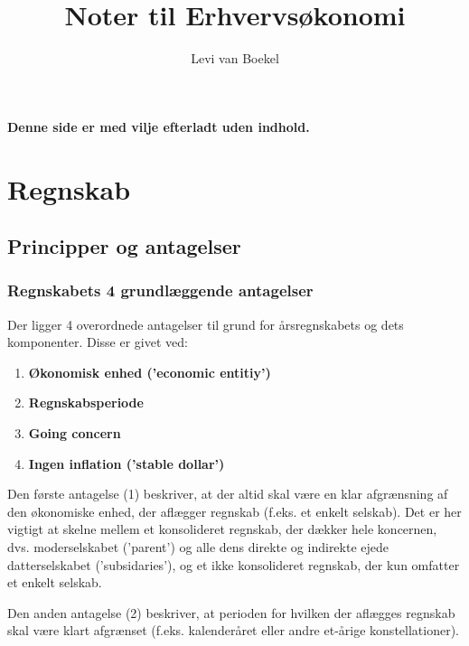 \documentclass[10pt,reqno, usenames]{article}
\title{Noter til Erhvervsøkonomi}
\author{Levi van Boekel}
\begin{document}
\maketitle


\tableofcontents

\newpage
\vspace*{\fill}
\begin{center}
    \textbf{Denne side er med vilje efterladt uden indhold.}
\end{center}
\vspace*{\fill}

\newpage
\section{Regnskab}

\subsection{Principper og antagelser}
\subsubsection{Regnskabets 4 grundlæggende antagelser}
Der ligger 4 overordnede antagelser til grund for årsregnskabets og dets komponenter. Disse er givet ved: 

\begin{enumerate}
    \item \textbf{Økonomisk enhed ('economic entitiy')}
    \item \textbf{Regnskabsperiode}
    \item \textbf{Going concern}
    \item \textbf{Ingen inflation ('stable dollar')}
\end{enumerate}

Den første antagelse (1) beskriver, at der altid skal være en klar afgrænsning af den økonomiske enhed, der aflægger regnskab (f.eks. et enkelt selskab). Det er her vigtigt at skelne mellem et konsolideret regnskab, der dækker hele koncernen, dvs. moderselskabet ('parent') og alle dens direkte og indirekte ejede datterselskabet ('subsidaries'), og et ikke konsolideret regnskab, der kun omfatter et enkelt selskab. 

\hspace{10 pt}

Den anden antagelse (2) beskriver, at perioden for hvilken der aflægges regnskab skal være klart afgrænset (f.eks. kalenderåret eller andre et-årige konstellationer). 
\end{document}
